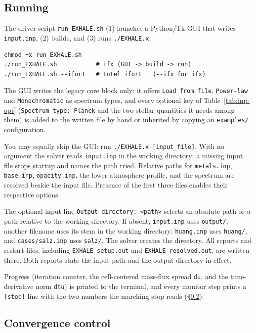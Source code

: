 \documentclass[english,a4paper]{my_memo}
\begin{document}
\subsection{Running}
The driver script \texttt{run\_EXHALE.sh} (1) launches a Python/Tk GUI that writes
\texttt{input.inp}, (2) builds, and (3) runs \texttt{./EXHALE.x}:
\begin{lstlisting}[style=sh]
chmod +x run_EXHALE.sh
./run_EXHALE.sh           # ifx (GUI -> build -> run)
./run_EXHALE.sh --ifort   # Intel ifort   (--ifx for ifx)
\end{lstlisting}
The GUI writes the legacy core block only: it offers \texttt{Load from file},
\texttt{Power-law} and \texttt{Monochromatic} as spectrum types, and every
optional key of Table~\ref{tab:inp-opt} (\texttt{Spectrum type: Planck} and
the two stellar quantities it needs among them) is added to the written file
by hand or inherited by copying an \texttt{examples/} configuration.

You may equally skip the GUI: run \texttt{./EXHALE.x [input\_file]}.
With no argument the solver reads \texttt{input.inp} in the working directory;
a missing input file stops startup and names the path tried. Relative paths
for \texttt{metals.inp}, \texttt{base.inp}, \texttt{opacity.inp}, the
lower-atmosphere profile, and the spectrum are resolved beside the input file.
Presence of the first three files enables their respective options.

The optional input line \texttt{Output directory: <path>} selects an absolute
path or a path relative to the working directory. If absent, \texttt{input.inp}
uses \texttt{output/}; another filename uses its stem in the working directory:
\texttt{huang.inp} uses \texttt{huang/}, and \texttt{cases/salz.inp} uses
\texttt{salz/}. The solver creates the directory. All reports and restart
files, including \texttt{EXHALE\_setup.out} and
\texttt{EXHALE\_resolved.out}, are written there. Both reports state the
input path and the output directory in effect.

Progress (iteration counter, the cell-centered mass-flux spread \texttt{du}, and
the time-derivative norm \texttt{dtu}) is printed to the terminal, and every
monitor step prints a \texttt{[stop]} line with the two numbers the marching
stop reads (\S\ref{sec:convctl}).

\subsection{Convergence control}\label{sec:convctl}
\end{document}

